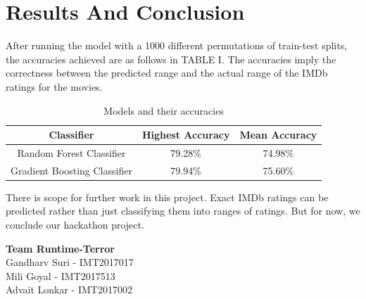 \documentclass[conference]{IEEEtran}
\begin{document}
\section{Results And Conclusion}
After running the model with a 1000 different permutations of train-test splits, the accuracies achieved are as follows in TABLE I. The accuracies imply the correctness between the predicted range and the actual range of the IMDb ratings for the movies.
\begin{table}[H]
    \begin{center}
        \caption{Models and their accuracies}
        \begin{tabular}{|c|c|c|}
            \hline
            \textbf{Classifier} & \textbf{Highest Accuracy} & \textbf{Mean Accuracy}\\
            \hline
             Random Forest Classifier &  79.28$\%$ & 74.98$\%$\\
             \hline
             Gradient Boosting Classifier & 79.94$\%$ & 75.60$\%$\\
             \hline            
        \end{tabular}
    \end{center}
\end{table}
There is scope for further work in this project. Exact IMDb ratings can be predicted rather than just classifying them into ranges of ratings. But for now, we conclude our hackathon project.

\begin{flushright}
\textbf{Team Runtime-Terror}\\
	 Gandharv Suri - IMT2017017\\
	 Mili Goyal - IMT2017513\\
	 Advait Lonkar - IMT2017002\\
\end{flushright}




\end{document}
